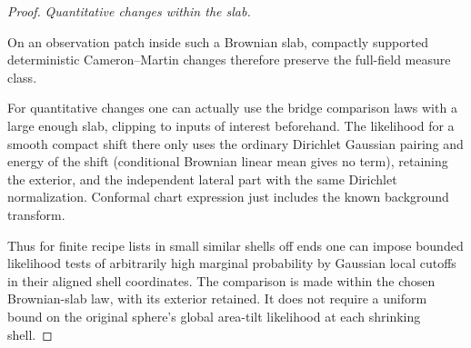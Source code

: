 \begin{proof}
\smallskip\noindent\emph{Quantitative changes within the slab.}\par

On an observation patch inside such a Brownian slab, compactly supported deterministic
Cameron–Martin changes therefore preserve the full-field measure class.

For quantitative changes one can actually use the bridge comparison laws with a large enough slab,
clipping to inputs of interest beforehand. The likelihood for a smooth compact shift there only uses
the ordinary Dirichlet Gaussian pairing and energy of the shift (conditional Brownian linear mean
gives no term), retaining the exterior, and the independent lateral part with the same Dirichlet
normalization. Conformal chart expression just includes the known background transform.

Thus for finite recipe lists in small similar shells off ends one can impose bounded likelihood
tests of arbitrarily high marginal probability by Gaussian local cutoffs in their aligned shell
coordinates. The comparison is made within the chosen Brownian-slab law,
with its exterior retained. It does not require a uniform bound on the
original sphere's global area-tilt likelihood at each shrinking shell.

\end{proof}

